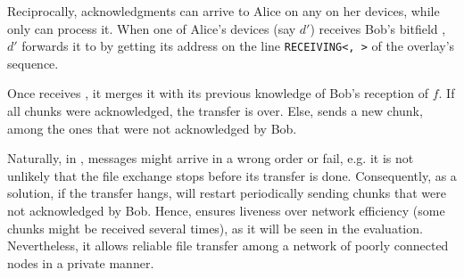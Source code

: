 Reciprocally, acknowledgments can arrive to Alice on any on her devices, while only \sendingdevice can process it.
When one of Alice's devices (say $d'$) receives Bob's bitfield \bitfield, 
$d'$ forwards it to \sendingdevice by getting its address on the line \texttt{RECEIVING<\sendingdevice, \fileid>} of the \squad overlay's sequence.


Once \sendingdevice receives \bitfield, it merges it with its previous knowledge of Bob's reception of $f$.
If all chunks were acknowledged, the transfer is over.
Else, \sendingdevice sends a new chunk, among the ones that were not acknowledged by Bob.


Naturally, in \name, messages might arrive in a wrong order or fail, e.g.
it is not unlikely that the file exchange stops before its transfer is done.
Consequently, as a solution, if the transfer hangs, \sendingdevice will restart periodically sending chunks that were not acknowledged by Bob.
Hence, \name ensures liveness over network efficiency (some chunks might be received several times), as it will be seen in the evaluation.
Nevertheless, it allows reliable file transfer among a network of poorly connected nodes in a private manner.